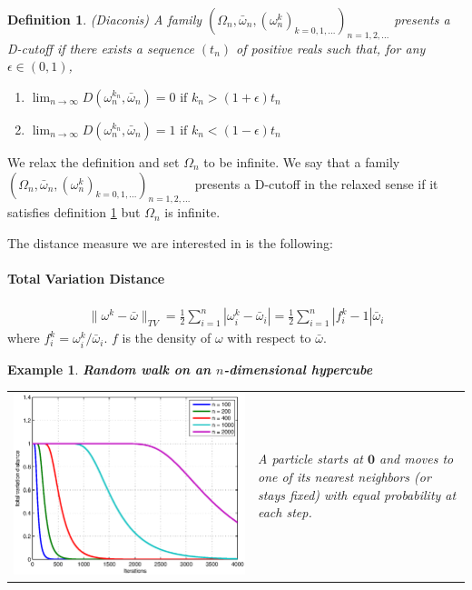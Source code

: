 \documentclass[landscape,a0b,final]{a0poster}
\newtheorem{example}{Example}
\newtheorem{definition}{Definition}
\newenvironment{poster}{
  \begin{center}
  \begin{minipage}[c]{0.98\textwidth}
}{
  \end{minipage} 
  \end{center}
}
\newenvironment{pcolumn}[1]{
  \begin{minipage}{#1\textwidth}
  \begin{center}
}{
  \end{center}
  \end{minipage}
}
\begin{document}
\begin{poster}
\begin{center}
\begin{pcolumn}{0.32}
{\begin{definition}
\label{cutoffdefinition}
(Diaconis) A family $(\Omega_n,\bar{\omega}_n, (\omega^k_n)_{k=0,1,...})_{n=1,2,...}$
presents a D-cutoff if there exists a sequence $(t_n)$ of positive
reals such that, for any $\epsilon \in(0,1)$,
\begin{enumerate}
  \item $\lim_{n \rightarrow \infty}D(\omega^{k_n}_n,\bar{\omega}_n) = 0 \mbox{ if }
  k_n>(1+\epsilon)t_n$
  \item $\lim_{n \rightarrow \infty}D(\omega^{k_n}_n,\bar{\omega}_n) = 1 \mbox{ if }
  k_n<(1-\epsilon)t_n $
\end{enumerate}
\end{definition}

We relax the definition and set $\Omega_n$ to be infinite. We say that a family $(\Omega_n,\bar{\omega}_n, (\omega^k_n)_{k=0,1,...})_{n=1,2,...}$ presents a D-cutoff in the relaxed sense if it satisfies definition \ref{cutoffdefinition} but $\Omega_n$ is infinite. 


The distance measure we are interested in is the following: 
\vspace{-0.8cm}

\paragraph{Total Variation Distance}
  \begin{eqnarray*}
   \|\omega^k - \bar{\omega}\|_{TV} = \frac{1}{2}\sum_{i=1}^n |\omega_i^k-\bar{\omega}_i |= \frac{1}{2}\sum_{i=1}^n |f_i^k-1|\bar{\omega}_i
  \end{eqnarray*}
  where $f^k_i = \omega_i^k/\bar{\omega}_i$. $f$ is the density of $\omega$ with respect to $\bar{\omega}$.

\begin{example} \textbf{Random walk on an $n$-dimensional hypercube          }

 \vspace{0.3cm}
  \begin{tabular}{c|l}
     \includegraphics[width=0.4\hsize]{rdwalk.eps} &
     \begin{minipage}[b]{0.58\hsize}
          A particle starts at $\mathbf{0}$ and moves to one of its nearest neighbors (or stays fixed) with equal probability at each step.
    

\end{minipage}
\end{tabular}
\end{example}}
\end{pcolumn}
\end{center}
\end{poster}
\end{document}
